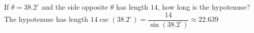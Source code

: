 {If $\theta = 38.2^{\circ}$ and the side opposite $\theta$ has length $14$, how long is the hypotenuse?}
{The hypotenuse has length $14 \csc(38.2^{\circ}) = \dfrac{14}{\sin(38.2^{\circ})} \approx 22.639$}
